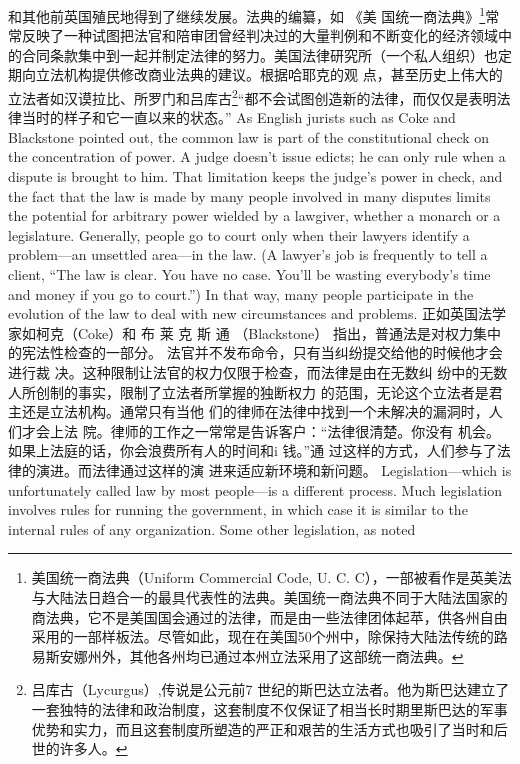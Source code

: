 \begin{paracol}{2}
和其他前英国殖民地得到了继续发展。法典的编纂，如 《美
国统一商法典》\footnote{美国统一商法典（Uniform Commercial Code, U. C. C），一部被看作是英美法与大陆法日趋合一的最具代表性的法典。美国统一商法典不同于大陆法国家的商法典，它不是美国国会通过的法律，而是由一些法律团体起苹，供各州自由采用的一部样板法。尽管如此，现在在美国50个州中，除保持大陆法传统的路易斯安娜州外，其他各州均已通过本州立法采用了这部统一商法典。}常常反映了一种试图把法官和陪审团曾经判决过的大量判例和不断变化的经济领域中的合同条款集中到一起并制定法律的努力。美国法律研究所（一个私人组织）也定期向立法机构提供修改商业法典的建议。根据哈耶克的观
点，甚至历史上伟大的立法者如汉谟拉比、所罗门和吕库古\footnote{吕库古（Lycurgus）,传说是公元前7 世纪的斯巴达立法者。他为斯巴达建立了一套独特的法律和政治制度，这套制度不仅保证了相当长时期里斯巴达的军事优势和实力，而且这套制度所塑造的严正和艰苦的生活方式也吸引了当时和后世的许多人。}“都不会试图创造新的法律，而仅仅是表明法律当时的样子和它一直以来的状态。”
\switchcolumn*
As English jurists such as Coke and Blackstone pointed out,
the common law is part of the constitutional check on the
concentration of power. A judge doesn't issue edicts; he can
only rule when a dispute is brought to him. That limitation keeps the judge's power in check, and the fact that the law is
made by many people involved in many disputes limits the
potential for arbitrary power wielded by a lawgiver, whether a
monarch or a legislature. Generally, people go to court only
when their lawyers identify a problem---an unsettled area---in
the law. (A lawyer's job is frequently to tell a client, ``The law
is clear. You have no case. You'll be wasting everybody's time
and money if you go to court.'') In that way, many people participate in the evolution of the law to deal with new circumstances and problems.
\switchcolumn
正如英国法学家如柯克（Coke）和 布 莱 克 斯 通 （Blackstone） 指出，普通法是对权力集中的宪法性检查的一部分。
法官并不发布命令，只有当纠纷提交给他的时候他才会进行裁
决。这种限制让法官的权力仅限于检查，而法律是由在无数纠
纷中的无数人所创制的事实，限制了立法者所掌握的独断权力
的范围，无论这个立法者是君主还是立法机构。通常只有当他
们的律师在法律中找到一个未解决的漏洞时，人们才会上法
院。律师的工作之一常常是告诉客户：“法律很清楚。你没有
机会。如果上法庭的话，你会浪费所有人的时间和i 钱。”通
过这样的方式，人们参与了法律的演进。而法律通过这样的演
进来适应新环境和新问题。
\switchcolumn*
Legislation---which is unfortunately called law by most people---is a different process. Much legislation involves rules for
running the government, in which case it is similar to the internal rules of any organization. Some other legislation, as noted

\end{paracol}
